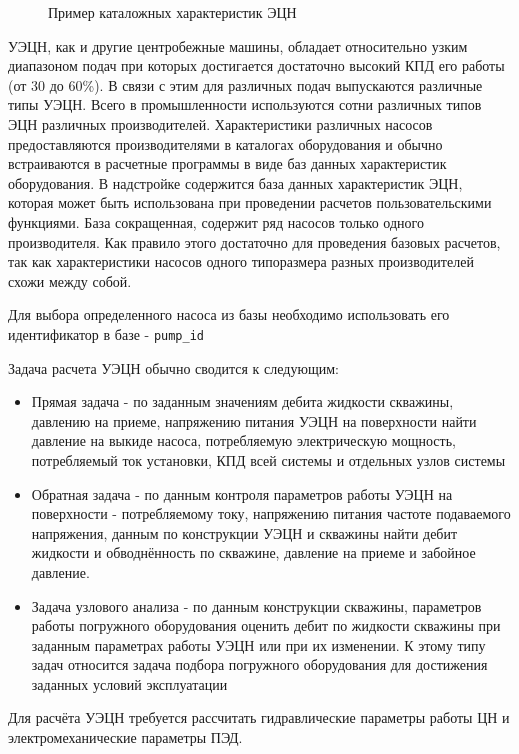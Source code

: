\begin{figure}[h!]
	\caption{Пример каталожных характеристик ЭЦН}
	\label{ris:novomet_ESP_80}
\end{figure}

УЭЦН, как и другие центробежные машины, обладает относительно узким диапазоном подач при которых достигается достаточно высокий КПД его работы (от 30 до 60\%). В связи с этим для различных подач выпускаются различные типы УЭЦН. Всего в промышленности используются сотни различных типов ЭЦН различных производителей. Характеристики различных насосов предоставляются производителями в каталогах оборудования и обычно встраиваются в расчетные программы в виде баз данных характеристик оборудования. В надстройке \unf{} содержится база данных характеристик ЭЦН, которая может быть использована при проведении расчетов пользовательскими функциями. База сокращенная, содержит ряд насосов только одного производителя. Как правило этого достаточно для проведения базовых расчетов, так как характеристики насосов одного типоразмера разных производителей схожи между собой. 

Для выбора определенного насоса из базы необходимо использовать его идентификатор в базе - \texttt{pump_id}

Задача расчета УЭЦН обычно сводится к следующим:
\begin{itemize}
	\item Прямая задача - по заданным значениям дебита жидкости скважины,  давлению на приеме, напряжению питания УЭЦН на поверхности найти давление на выкиде насоса, потребляемую электрическую мощность, потребляемый ток установки, КПД всей системы и отдельных узлов системы
	\item Обратная задача - по данным контроля параметров работы УЭЦН на поверхности - потребляемому току, напряжению питания частоте подаваемого напряжения, данным по конструкции УЭЦН и скважины найти дебит жидкости и обводнённость по скважине, давление на приеме и забойное давление.
	\item Задача узлового анализа - по данным конструкции скважины, параметров работы погружного оборудования оценить дебит по жидкости скважины при заданным параметрах работы УЭЦН или при их изменении. К этому типу задач относится задача подбора погружного оборудования для достижения заданных условий эксплуатации 
	
\end{itemize}

Для расчёта УЭЦН требуется рассчитать гидравлические параметры работы ЦН и электромеханические параметры ПЭД.

